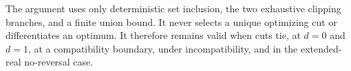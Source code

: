 The argument uses only deterministic set inclusion, the two exhaustive clipping branches, and a finite union bound. It never selects a unique optimizing cut or differentiates an optimum. It therefore remains valid when cuts tie, at \(d=0\) and \(d=1\), at a compatibility boundary, under incompatibility, and in the extended-real no-reversal case.